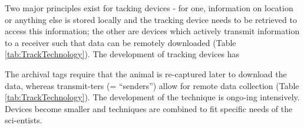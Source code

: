 \documentclass[
]{book}
\begin{document}
Two major principles exist for tacking devices - for one, information on location or anything else is stored locally and the tracking device needs to be retrieved to access this information; the other are devices which actively transmit information to a receiver such that data can be remotely downloaded (Table \ref{tab:TrackTechnology}). The development of tracking devices has

The archival tags require that the animal is re-captured later to download the data, whereas transmit-ters (= ``senders'') allow for remote data collection (Table \ref{tab:TrackTechnology}). The development of the technique is ongo-ing intensively. Devices become smaller and techniques are combined to fit specific needs of the sci-entists.

\begin{table}


\end{table}
\end{document}
